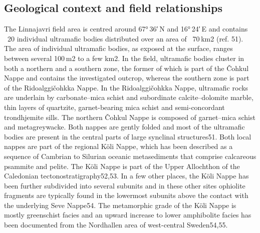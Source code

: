 \subsection{Geological context and field relationships}
The Linnajavri field area is centred around 67° 36′ N and 16° 24′ E and contains ~20 individual ultramafic bodies distributed over an area of ~70 km2 (ref. 51). The area of individual ultramafic bodies, as exposed at the surface, ranges between several 100 m2 to a few km2. In the field, ultramafic bodies cluster in both a northern and a southern zone, the former of which is part of the Čohkul Nappe and contains the investigated outcrop, whereas the southern zone is part of the Ridoalggičohkka Nappe. In the Ridoalggičohkka Nappe, ultramafic rocks are underlain by carbonate–mica schist and subordinate calcite–dolomite marble, thin layers of quartzite, garnet-bearing mica schist and semi-concordant trondhjemite sills. The northern Čohkul Nappe is composed of garnet–mica schist and metagreywacke. Both nappes are gently folded and most of the ultramafic bodies are present in the central parts of large synclinal structures51. Both local nappes are part of the regional Köli Nappe, which has been described as a sequence of Cambrian to Silurian oceanic metasediments that comprise calcareous psammite and pelite. The Köli Nappe is part of the Upper Allochthon of the Caledonian tectonostratigraphy52,53. In a few other places, the Köli Nappe has been further subdivided into several subunits and in these other sites ophiolite fragments are typically found in the lowermost subunits above the contact with the underlying Seve Nappe54. The metamorphic grade of the Köli Nappe is mostly greenschist facies and an upward increase to lower amphibolite facies has been documented from the Nordhallen area of west-central Sweden54,55.

